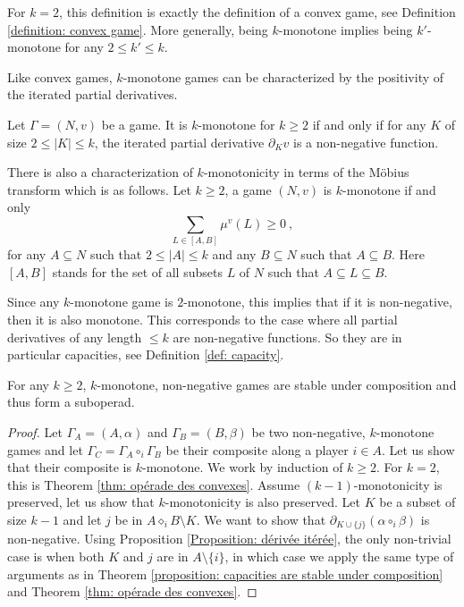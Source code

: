\documentclass[a4paper,12pt]{amsart}
\begin{document}
\begin{remark}
For $k =2$, this definition is exactly the definition of a convex game, see Definition \ref{definition: convex game}. More generally, being $k$-monotone implies being $k'$-monotone for any $2 \leq k' \leq k$. 
\end{remark}

Like convex games, $k$-monotone games can be characterized by the positivity of the iterated partial derivatives. 

\begin{theorem}
Let $\Gamma = (N,v)$ be a game. It is $k$-monotone for $k \geq 2$ if and only if for any $K$ of size $2 \leq |K| \leq k$, the iterated partial derivative $\partial_K v$ is a non-negative function. 
\end{theorem}

\begin{remark}
There is also a characterization of $k$-monotonicity in terms of the Möbius transform which is as follows. Let $k \geq 2$, a game $(N,v)$ is $k$-monotone if and only 
\[
\sum_{L \in [A,B]} \mu^v(L) \geq 0~,
\]
for any $A \subseteq N$ such that $2 \leq |A| \leq k$ and any $B \subseteq N$ such that $A \subseteq B$. Here $[A,B]$ stands for the set of all subsets $L$ of $N$ such that $A \subseteq L \subseteq B$. 
\end{remark}

Since any $k$-monotone game is $2$-monotone, this implies that if it is non-negative, then it is also monotone. This corresponds to the case where all partial derivatives of any length $\leq k$ are non-negative functions. So they are in particular capacities, see Definition \ref{def: capacity}.

\begin{theorem}\label{thm: opérade des k-monotones}
For any $k \geq 2$, $k$-monotone, non-negative games are stable under composition and thus form a suboperad. 
\end{theorem}

\begin{proof}
Let \(\Gamma_A = (A, \alpha) \) and \(\Gamma_B = (B, \beta)\) be two non-negative, $k$-monotone games and let \(\Gamma_C = \Gamma_A \circ_i \Gamma_B\) be their composite along a player \(i \in A\). Let us show that their composite is $k$-monotone. We work by induction of $k \geq 2$. For $k = 2$, this is Theorem \ref{thm: opérade des convexes}. Assume $(k-1)$-monotonicity is preserved, let us show that $k$-monotonicity is also preserved. Let $K$ be a subset of size $k-1$ and let $j$ be in $A \diamond_i B \setminus K$. We want to show that $\partial_{K \cup \{j\}}(\alpha \circ_i \beta)$ is non-negative. Using Proposition \ref{Proposition: dérivée itérée}, the only non-trivial case is when both $K$ and $j$ are in $A \setminus \{i\}$, in which case we apply the same type of arguments as in Theorem \ref{proposition: capacities are stable under composition} and Theorem \ref{thm: opérade des convexes}. 
\end{proof}
\end{document}
